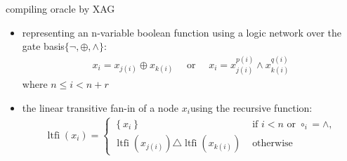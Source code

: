 \begin{frame}{compiling oracle by XAG}
  \begin{itemize}
    \item representing an n-variable boolean function using a logic network over the gate basis$\{\lnot ,\oplus ,\wedge \}$:
    \begin{align}
      x_{i} = x_{j(i)} \oplus x_{k(i)} \quad \text { or } \quad x_{i} = x_{j(i)}^{p(i)} \wedge x_{k(i)}^{q(i)}
    \end{align}
    where $n\leq i < n+r$
    \item  the linear transitive fan-in of a node $x_i $using the recursive function:
    \begin{align}
      \operatorname{ltfi}\left(x_{i}\right) = \left\{\begin{array}{ll}
      \left\{x_{i}\right\} & \text { if } i < n \text { or } \circ_{i}  = \wedge, \\
      \operatorname{ltfi}\left(x_{j(i)}\right) \triangle \operatorname{ltfi}\left(x_{k(i)}\right) & \text { otherwise }
      \end{array}\right.
    \end{align}
  \end{itemize}
\end{frame}
